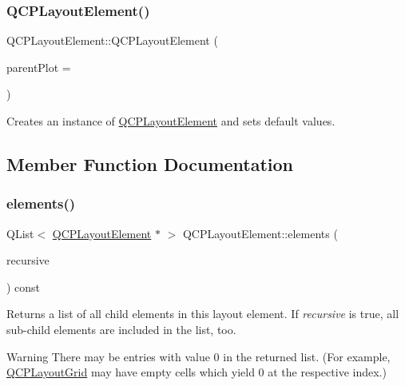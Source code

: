\subsubsection{\texorpdfstring{Q\+C\+P\+Layout\+Element()}{QCPLayoutElement()}}
{\footnotesize\ttfamily Q\+C\+P\+Layout\+Element\+::\+Q\+C\+P\+Layout\+Element (\begin{DoxyParamCaption}\item[{\mbox{\hyperlink{class_q_custom_plot}{Q\+Custom\+Plot}} $\ast$}]{parent\+Plot = {} }\end{DoxyParamCaption})\hspace{0.3cm}{\ttfamily [explicit]}}

Creates an instance of \mbox{\hyperlink{class_q_c_p_layout_element}{Q\+C\+P\+Layout\+Element}} and sets default values. 

\subsection{Member Function Documentation}
\mbox{\label{class_q_c_p_layout_element_a76dec8cb31e498994a944d7647a43309}} 
\subsubsection{\texorpdfstring{elements()}{elements()}}
{\footnotesize\ttfamily Q\+List$<$ \mbox{\hyperlink{class_q_c_p_layout_element}{Q\+C\+P\+Layout\+Element}} $\ast$ $>$ Q\+C\+P\+Layout\+Element\+::elements (\begin{DoxyParamCaption}\item[{bool}]{recursive }\end{DoxyParamCaption}) const\hspace{0.3cm}{\ttfamily [virtual]}}

Returns a list of all child elements in this layout element. If {\itshape recursive} is true, all sub-\/child elements are included in the list, too.

\begin{DoxyWarning}{Warning}
There may be entries with value 0 in the returned list. (For example, \mbox{\hyperlink{class_q_c_p_layout_grid}{Q\+C\+P\+Layout\+Grid}} may have empty cells which yield 0 at the respective index.) 
\end{DoxyWarning}


